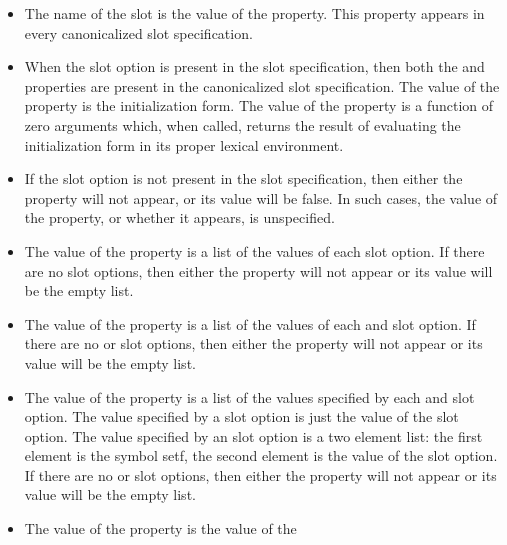 \begin{itemize}
    \begin{itemize}
    \item 
        The name of the slot is the value of the  property. This property
        appears in every canonicalized slot specification. 
      \item 
        When the  slot option is present in the slot specification,
        then both the  and  properties are
        present in the 
        canonicalized slot specification. The value of the  property is
        the initialization form. The value of the  property is a
        function of zero arguments which, when called, returns the result of
        evaluating the initialization form in its proper lexical environment. 
      \item 
        If the  slot option is not present in the slot specification,
        then either the  property will not appear, or its value
        will be false. In such cases, the value of the  property, or
        whether it appears, is unspecified. 
      \item 
        The value of the  property is a list of the values of each
         slot option. If there are no  slot options, then either
        the  property will not appear or its value will be the empty
        list. 
      \item 
        The value of the  property is a list of the values of each
         and  slot option. If there are no
         or  
        slot options, then either the  property will not appear or its
        value will be the empty list. 
      \item 
        The value of the  property is a list of the values specified by
        each  and  slot option. The value specified by
        a  
        slot option is just the value of the slot option. The value specified by
        an  slot option is a two element list: the first element is the
        symbol setf, the second element is the value of the slot option. If
        there are no  or  slot options, then either
        the  
        property will not appear or its value will be the empty list. 
      \item 
        The value of the  property is the value of the

\end{itemize}
\end{itemize}
